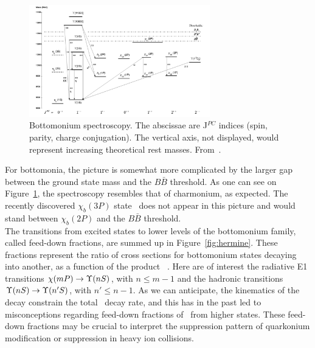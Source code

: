 \begin{figure}[htb]
\begin{center}
  \includegraphics[width=0.7\textwidth]{Chapters/pQuarkonia/bottomonium.png}
  \caption{Bottomonium spectroscopy. The abscissae are J$^{PC}$ indices
  (spin, parity, charge conjugation). The vertical axis, not
  displayed, would represent increasing theoretical rest masses. From~\cite{spectro}.}
  \label{fig:bottomonium}
\end{center}
\end{figure}
\vspace{0.3cm}
For bottomonia, the picture is somewhat more complicated by the larger
gap between the ground state mass and the $B\bar{B}$ threshold. As one
can see on Figure~\ref{fig:bottomonium}, the spectroscopy resembles
that of charmonium, as expected. The recently discovered $\chi_b(3P)$
state~\cite{chib3p,chib3p_lhcb} does not appear in this picture and
would stand between $\chi_b(2P)$ and the $B\bar{B}$ threshold.
\\
The transitions from excited states to lower levels of the bottomonium
family, called feed-down
fractions, are summed up in Figure~\ref{fig:hermine}. These
fractions represent the ratio of cross sections for bottomonium states
decaying into another, as a function of the product \PgU~\pt. Here are of
interest the radiative E1 transitions $\chi(mP) \to \Upsilon(nS)$, with $n\leq
m-1$ and the hadronic transitions $\Upsilon(nS) \to \Upsilon(n'S)$, with $n'
\leq n-1$. As we can anticipate, the kinematics of the decay constrain the
total \PgU~decay
rate, and this has in the past led to misconceptions regarding
feed-down fractions of \PgUa~from higher states. These feed-down
fractions may be crucial to interpret the suppression 
pattern of quarkonium modification or suppression in heavy ion collisions.



